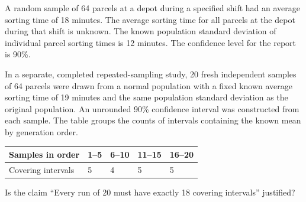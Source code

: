 \clearpage
{}
A random sample of 64 parcels at a depot during a specified shift had an average sorting time of 18 minutes. The average sorting time for all parcels at the depot during that shift is unknown. The known population standard deviation of individual parcel sorting times is 12 minutes. The confidence level for the report is 90\%.

In a separate, completed repeated-sampling study, 20 fresh independent samples of 64 parcels were drawn from a normal population with a fixed known average sorting time of 19 minutes and the same population standard deviation as the original population. An unrounded 90\% confidence interval was constructed from each sample. The table groups the counts of intervals containing the known mean by generation order.

\begin{center}\begin{tabular}{@{}lllll@{}}\toprule
Samples in order & 1--5 & 6--10 & 11--15 & 16--20\\\midrule
Covering intervals & 5 & 4 & 5 & 5\\
\bottomrule\end{tabular}\end{center}


\BlankInformationTable
\clearpage
{}

Is the claim ``Every run of 20 must have exactly 18 covering intervals'' justified?
\vfill

